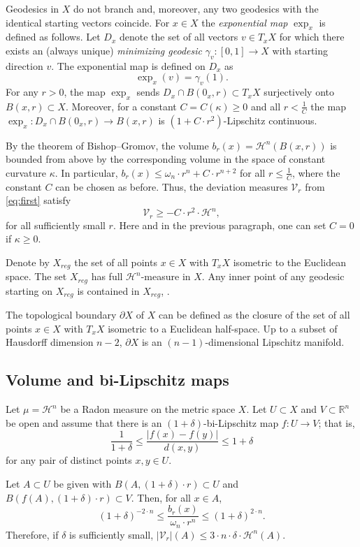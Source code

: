 \documentclass[12pt,leqno,intlimits]{amsart}
\numberwithin{equation}{section}
\theoremstyle{definition}
\theoremstyle{remark}
\newcommand{\R}{\mathbb{R}}
\def\:{\colon}
\begin{document}
Geodesics in $X$ do not branch
and, moreover, any two geodesics with the identical starting vectors coincide.
For $x\in X$ the \emph{exponential map} $\exp_x$ is defined as follows.
Let $D_x$ denote the set of all vectors $v\in T_xX$ for which there exists an (always unique) \emph{minimizing geodesic} $\gamma_v\:[0,1] \to X$ with starting direction $v$. The exponential map is defined on $D_x$ as
$$\exp _x (v)= \gamma _v(1).$$
For any $r>0$, the map $\exp_x$ sends $D_x\cap B (0_x,r)\subset T_xX$ surjectively onto $B(x,r)\subset X$.
Moreover, for a constant $C=C(\kappa)\geq 0$ and all $r< \frac 1 C$ the map $\exp_x \:D_x \cap B(0_x,r) \to B(x,r)$ is $(1+ C \cdot r^2)$-Lipschitz continuous.

By the theorem of Bishop--Gromov, the volume $b_r (x)=\mathcal H^n (B(x,r))$ is bounded from above by the corresponding volume in the
space of constant curvature $\kappa$. In particular, $b_r (x) \leq \omega _n \cdot r^n + C \cdot r^{n+2}$ for all $r\leq \frac 1 C$, where
the constant $C$ can be chosen as before. Thus, the deviation measures $\mathcal{V}_r $ from \eqref{eq:first} satisfy
$$\mathcal{V}_r \geq -C\cdot r^2\cdot  \mathcal H^n,$$
for all sufficiently small $r$.
Here and in the previous paragraph, one can set $C=0$ if $\kappa \geq 0$.

Denote by $X_{reg}$ the set of all points $x\in X$ with $T_xX$ isometric to the Euclidean space.
The set $X_{reg}$ has full $\mathcal H^n$-measure in $X$.
Any inner point of any geodesic starting on $X_{reg}$ is contained in $X_{reg}$, \cite{Petparallel}.

The topological boundary $\partial X$ of $X$ can be defined as the closure of the set of all points $x\in X$ with $T_xX$ isometric to a Euclidean half-space. Up to a subset of Hausdorff dimension $n-2$, $\partial X$ is an $(n-1)$-dimensional Lipschitz manifold.

\subsection{Volume and bi-Lipschitz maps}
Let $\mu =\mathcal H^n$ be a Radon measure on the metric space $X$.
Let $U\subset X$ and $V\subset \R^n$ be open and assume that there is an $(1+\delta)$-bi-Lipschitz map $f\:U \to V$;
that is,
\[\frac1{1+\delta}\le\frac{|f(x)-f(y)|}{d(x,y)}\le 1+\delta\]
for any pair of distinct points $x,y\in U$.

Let $A\subset U$ be given with
$B (A,{(1+\delta) \cdot r}) \subset U$ and $B (f(A),{(1+\delta) \cdot r}) \subset V$. Then, for all $x\in A$,
\begin{equation} \label{eq:bilip}
(1+\delta) ^{-2\cdot n} \leq \frac {b_r(x)} {\omega _n \cdot r^n} \leq (1+\delta ) ^{2\cdot n}.
\end{equation}
Therefore, if $\delta $ is sufficiently small, $|\mathcal{V}_r | (A) \leq 3\cdot  n \cdot \delta \cdot \mathcal H^n (A).$
\end{document}
